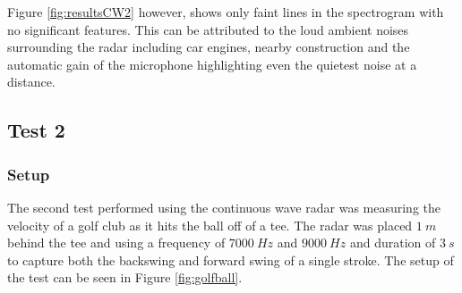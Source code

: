 Figure \ref{fig:resultsCW2} however, shows only faint lines in the spectrogram with no significant features. This can be attributed to the loud ambient noises surrounding the radar including car engines, nearby construction and the automatic gain of the microphone highlighting even the quietest noise at a distance.


\subsection{Test 2}
\subsubsection{Setup}
The second test performed using the continuous wave radar was measuring the velocity of a golf club as it hits the ball off of a tee. The radar was placed $1\ m$ behind the tee and using a frequency of $7000\ Hz$ and $9000\ Hz$ and duration of $3\ s$ to capture both the backswing and forward swing of a single stroke. The setup of the test can be seen in Figure \ref{fig:golfball}.

